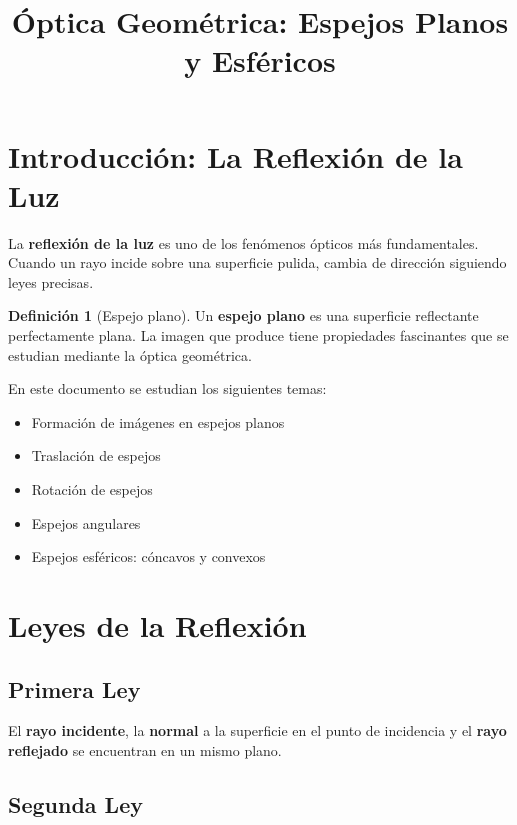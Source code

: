 \documentclass[12pt, a4paper]{article}
\title{\textbf{Óptica Geométrica: Espejos Planos y Esféricos}}
\author{}
\date{}
\theoremstyle{definition}
\newtheorem{definicion}{Definición}[section]
\begin{document}
\maketitle
\thispagestyle{empty}
\tableofcontents
\newpage

\section{Introducción: La Reflexión de la Luz}

La \textbf{reflexión de la luz} es uno de los fenómenos ópticos más fundamentales. Cuando un rayo incide sobre una superficie pulida, cambia de dirección siguiendo leyes precisas.

\begin{definicion}[Espejo plano]
Un \textbf{espejo plano} es una superficie reflectante perfectamente plana. La imagen que produce tiene propiedades fascinantes que se estudian mediante la óptica geométrica.
\end{definicion}

En este documento se estudian los siguientes temas:
\begin{itemize}
  \item Formación de imágenes en espejos planos
  \item Traslación de espejos
  \item Rotación de espejos
  \item Espejos angulares
  \item Espejos esféricos: cóncavos y convexos
\end{itemize}

\section{Leyes de la Reflexión}

\subsection{Primera Ley}

El \textbf{rayo incidente}, la \textbf{normal} a la superficie en el punto de incidencia y el \textbf{rayo reflejado} se encuentran en un mismo plano.

\subsection{Segunda Ley}
\end{document}
